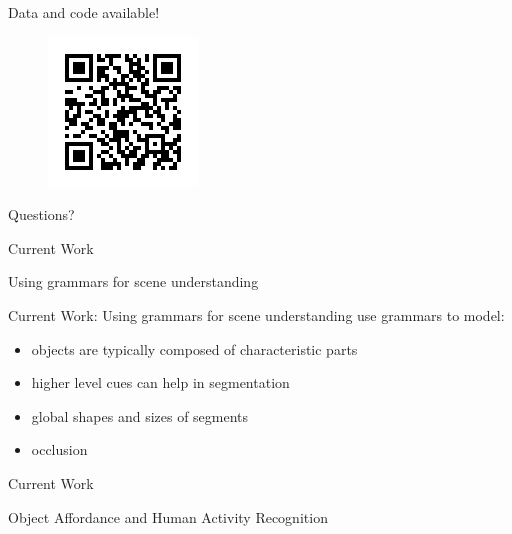 \documentclass{beamer}
\begin{document}
\begin{frame}
\begin{block}{Data and code available!}
 \begin{figure}   
\includegraphics[width=0.25\linewidth]{qr.png}
 \end{figure}
\end{block}

\begin{block}{}

\begin{center}

{\Huge 
Questions?
}

\end{center}

\end{block}

\end{frame}


\begin{frame}{Current Work}
\begin{center}
{\huge
Using grammars for scene understanding
}
\end{center}
\end{frame}

\begin{frame}{Current Work: Using grammars for scene understanding}
use grammars to model:
\begin{itemize}
\item objects are typically composed of characteristic parts
\item higher level cues can help in segmentation
\item global shapes and sizes of segments
\item occlusion
\end{itemize}

\end{frame}


\begin{frame}{Current Work}
\begin{center}
{\huge
Object Affordance and Human Activity Recognition
}
\end{center}
\end{frame}
\end{document}
